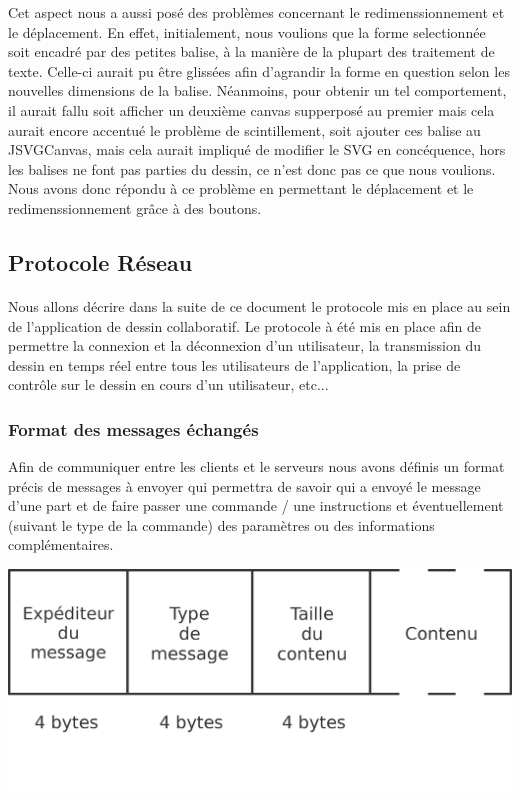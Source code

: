 \documentclass[a4paper,11pt]{article}
\begin{document}
Cet aspect nous a aussi posé des problèmes concernant le redimenssionnement et le déplacement. En effet, initialement, nous voulions que la forme selectionnée soit encadré par des petites balise, à la manière de la plupart des traitement de texte. Celle-ci aurait pu être glissées afin d'agrandir la forme en question selon les nouvelles dimensions de la balise. Néanmoins, pour obtenir un tel comportement, il aurait fallu soit afficher un deuxième canvas supperposé au premier mais cela aurait encore accentué le problème de scintillement, soit ajouter ces balise au JSVGCanvas, mais cela aurait impliqué de modifier le SVG en concéquence, hors les balises ne font pas parties du dessin, ce n'est donc pas ce que nous voulions. Nous avons donc répondu à ce problème en permettant le déplacement et le redimenssionnement grâce à des boutons.

\subsection{Protocole Réseau}

\paragraph{} Nous allons décrire dans la suite de ce document le protocole mis en place au sein de l'application de dessin collaboratif. Le protocole à été mis en place afin de permettre la connexion et la déconnexion d'un utilisateur, la transmission du dessin en temps réel entre tous les utilisateurs de l'application, la prise de contrôle sur le dessin en cours d'un utilisateur, etc... 

\subsubsection{Format des messages échangés}
Afin de communiquer entre les clients et le serveurs nous avons définis un format précis de messages à envoyer qui permettra de savoir qui a envoyé le message d'une part et de faire passer une commande / une instructions et éventuellement (suivant le type de la commande) des paramètres ou des informations complémentaires.

\begin{center}
\includegraphics[scale=0.5]{image/message.png}
\end{center}
\end{document}
